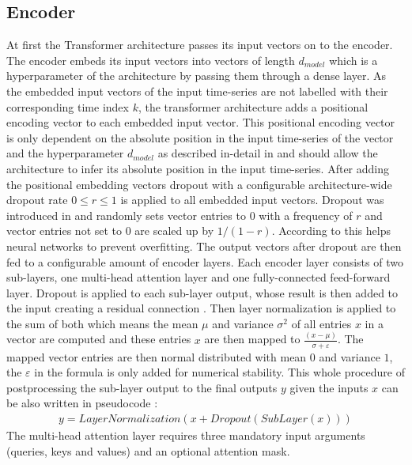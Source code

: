\documentclass[draft,final]{vutinfth} %
\begin{document}
    \subsection{Encoder} \label{encoder}
    At first the Transformer architecture passes its input vectors on to the encoder.
    The encoder embeds its input vectors into vectors of length $d_{model}$ which is a hyperparameter of the architecture by passing them through a dense layer.
    As the embedded input vectors of the input time-series are not labelled with their corresponding time index $k$, the transformer architecture adds a positional encoding vector to each embedded input vector.
    This positional encoding vector is only dependent on the absolute position in the input time-series of the vector and the hyperparameter $d_{model}$ as described in-detail in \cite[p. 6]{Transformer} and should allow the architecture to infer its absolute position in the input time-series.
    After adding the positional embedding vectors dropout with a configurable architecture-wide dropout rate $0 \leq r \leq 1$ is applied to all embedded input vectors.
    Dropout was introduced in \cite{dropout} and randomly sets vector entries to $0$ with a frequency of $r$ and vector entries not set to $0$ are scaled up by $1/(1-r)$.
    According to \cite[p. 1]{dropout} this helps neural networks to prevent overfitting.
    The output vectors after dropout are then fed to a configurable amount of encoder layers.
    Each encoder layer consists of two sub-layers, one multi-head attention layer and one fully-connected feed-forward layer.
    Dropout is applied to each sub-layer output, whose result is then added to the input creating a residual connection \cite{ResNet}.
    Then layer normalization \cite{layer_norm} is applied to the sum of both which means the mean $\mu$ and variance $\sigma^2$ of all entries $x$ in a vector are computed and these entries $x$ are then mapped to $\frac{(x-\mu)}{\sigma + \varepsilon}$.
    The mapped vector entries are then normal distributed with mean $0$ and variance $1$, the $\varepsilon$ in the formula is only added for numerical stability.
    This whole procedure of postprocessing the sub-layer output to the final outputs $y$ given the inputs $x$ can be also written in pseudocode \cite[p. 3]{Transformer}:
    \begin{align}
    y = LayerNormalization(x + Dropout(SubLayer(x)))
    \end{align}
    The multi-head attention layer requires three mandatory input arguments (queries, keys and values) and an optional attention mask.
\end{document}
